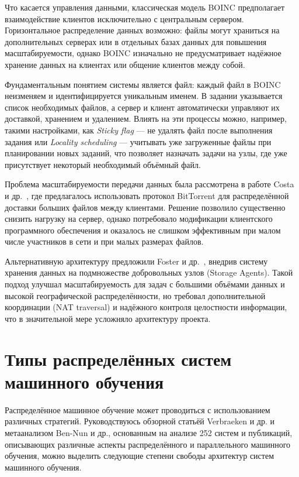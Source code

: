 \documentclass[a4paper,12pt]{extarticle}
\begin{document}
Что касается управления данными, классическая модель BOINC предполагает взаимодействие клиентов исключительно с центральным сервером. Горизонтальное распределение данных возможно: файлы могут храниться на дополнительных серверах или в отдельных базах данных для повышения масштабируемости, однако BOINC изначально не предусматривает надёжное хранение данных на клиентах или общение клиентов между собой.

Фундаментальным понятием системы является файл: каждый файл в BOINC неизменяем и идентифицируется уникальным именем. В задании указывается список необходимых файлов, а сервер и клиент автоматически управляют их доставкой, хранением и удалением. Влиять на эти процессы можно, например, такими настройками, как \textit{Sticky flag} — не удалять файл после выполнения задания или \textit{Locality scheduling} — учитывать уже загруженные файлы при планировании новых заданий, что позволяет назначать задачи на узлы, где уже присутствует некоторый необходимый объёмный файл.

Проблема масштабируемости передачи данных была рассмотрена в работе Costa и др.~\cite{costa2008optimizing}, где предлагалось использовать протокол BitTorrent для распределённой доставки больших файлов между клиентами. Решение позволило существенно снизить нагрузку на сервер, однако потребовало модификации клиентского программного обеспечения и оказалось не слишком эффективным при малом числе участников в сети и при малых размерах файлов.

Альтернативную архитектуру предложили Foster и др.~\cite{alonso2017new}, внедрив систему хранения данных на подмножестве добровольных узлов (Storage Agents). Такой подход улучшал масштабируемость для задач с большими объёмами данных и высокой географической распределённости, но требовал дополнительной координации (NAT traversal) и надёжного контроля целостности информации, что в значительной мере усложняло архитектуру проекта.

\section{Типы распределённых систем машинного обучения}

Распределённое машинное обучение может проводиться с использованием различных стратегий. Руководствуюсь обзорной статьёй Verbraeken и др.\cite{verbraeken2020survey} и метаанализом Ben-Nun и др.\cite{ben-nun2019demystifying}, основанным на анализе 252 систем и публикаций, описывающих различные аспекты распределённого и параллельного машинного обучения, можно выделить следующие степени свободы архитектур систем машинного обучения.
\end{document}
